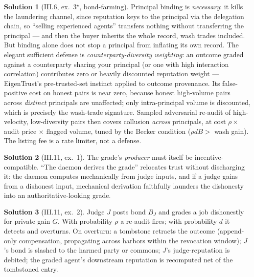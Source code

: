 \documentclass[11pt,a4paper]{article}
\theoremstyle{definition}
\newtheorem{sol}{Solution}
\theoremstyle{remark}
\begin{document}
\begin{sol}[III.6, ex.\ 3$^\star$, bond-farming]
Principal binding is \emph{necessary}: it kills the laundering channel, since reputation keys to the principal via the delegation chain, so ``selling experienced agents'' transfers nothing without transferring the principal --- and then the buyer inherits the whole record, wash trades included. But binding alone does not stop a principal from inflating its own record. The elegant sufficient defense is \emph{counterparty-diversity weighting}: an outcome graded against a counterparty sharing your principal (or one with high interaction correlation) contributes zero or heavily discounted reputation weight --- EigenTrust's pre-trusted-set instinct applied to outcome provenance. Its false-positive cost on honest pairs is near zero, because honest high-volume pairs across \emph{distinct} principals are unaffected; only intra-principal volume is discounted, which is precisely the wash-trade signature. Sampled adversarial re-audit of high-velocity, low-diversity pairs then covers collusion \emph{across} principals, at cost $\rho \times$ audit price $\times$ flagged volume, tuned by the Becker condition ($\rho d B > $ wash gain). The listing fee is a rate limiter, not a defense.
\end{sol}

\begin{sol}[III.11, ex.\ 1]
The grade's \emph{producer} must itself be incentive-compatible. ``The daemon derives the grade'' relocates trust without discharging it: the daemon computes mechanically from judge inputs, and if a judge gains from a dishonest input, mechanical derivation faithfully launders the dishonesty into an authoritative-looking grade.
\end{sol}

\begin{sol}[III.11, ex.\ 2]
Judge $J$ posts bond $B_J$ and grades a job dishonestly for private gain $G$. With probability $\rho$ a re-audit fires; with probability $d$ it detects and overturns. On overturn: a tombstone retracts the outcome (append-only compensation, propagating across harbors within the revocation window); $J$'s bond is slashed to the harmed party or commons; $J$'s judge-reputation is debited; the graded agent's downstream reputation is recomputed net of the tombstoned entry.
\end{sol}
\end{document}
